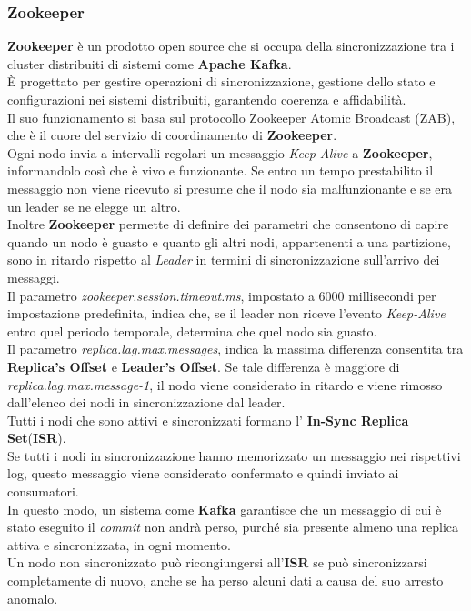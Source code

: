 \subsubsection{Zookeeper}
\textbf{Zookeeper} è un prodotto \gls{open source}{} che si occupa della sincronizzazione tra i \gls{cluster}{} distribuiti di sistemi come \textbf{Apache Kafka}. \\
È progettato per gestire operazioni di sincronizzazione, gestione dello stato e configurazioni nei sistemi distribuiti, garantendo coerenza e affidabilità.\\
Il suo funzionamento si basa sul protocollo Zookeeper Atomic Broadcast (ZAB), che è il cuore del servizio di coordinamento di \textbf{Zookeeper}.\\
Ogni nodo invia a intervalli regolari un messaggio \textit{Keep-Alive} a \textbf{Zookeeper}, informandolo così che è vivo e funzionante. Se entro un tempo prestabilito il messaggio non viene ricevuto si presume che il nodo sia
malfunzionante e se era un leader se ne elegge un altro.\\
Inoltre \textbf{Zookeeper} permette di definire dei parametri che consentono di capire quando un nodo è guasto e quanto gli altri nodi, appartenenti a una partizione,  sono in ritardo rispetto al \textit{Leader} in termini di sincronizzazione sull'arrivo dei messaggi.\\
Il parametro \textit{zookeeper.session.timeout.ms}, impostato a 6000 millisecondi per impostazione predefinita, indica che, se il leader non riceve l'evento \textit{Keep-Alive} entro quel periodo temporale, determina che quel nodo sia guasto.\\
Il parametro \textit{replica.lag.max.messages}, indica la massima differenza consentita tra \textbf{Replica's Offset} e \textbf{Leader's Offset}. Se tale differenza è maggiore di \textit{replica.lag.max.message-1}, il nodo viene considerato in ritardo e viene rimosso dall'elenco dei nodi in sincronizzazione dal leader. \\
Tutti i nodi che sono attivi e sincronizzati formano l' \textbf{In-Sync Replica Set}(\textbf{ISR}).\\
Se tutti i nodi in sincronizzazione hanno memorizzato un messaggio nei rispettivi \gls{log}{}, questo messaggio viene considerato confermato e quindi inviato ai consumatori. \\
In questo modo, un sistema come \textbf{Kafka} garantisce che un messaggio di cui è stato eseguito il \textit{commit} non andrà perso, purché sia presente almeno una replica attiva e sincronizzata, in ogni momento.\\
Un nodo non sincronizzato può ricongiungersi all'\textbf{ISR} se può sincronizzarsi completamente di nuovo, anche se ha perso alcuni dati a causa del suo arresto anomalo.
\pagebreak

